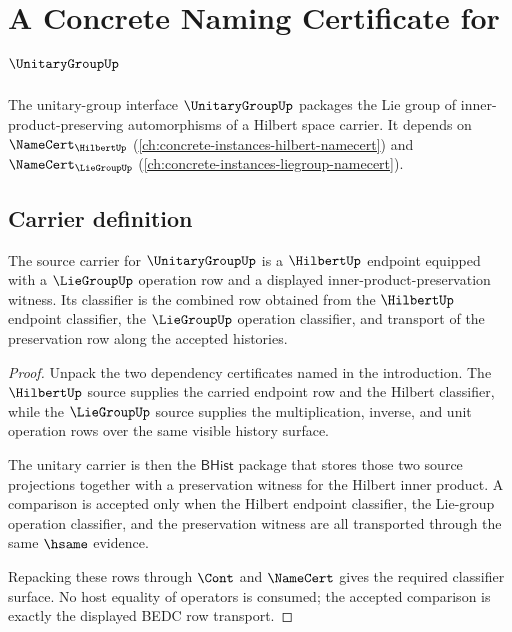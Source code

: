 \chapter{A Concrete Naming Certificate for $\UnitaryGroupUp$}
\label{ch:concrete-instances-unitarygroup-namecert}

The unitary-group interface $\UnitaryGroupUp$ packages the Lie group of inner-product-preserving automorphisms of a Hilbert space carrier. It depends on $\NameCert_{\HilbertUp}$ (\autoref{ch:concrete-instances-hilbert-namecert}) and $\NameCert_{\LieGroupUp}$ (\autoref{ch:concrete-instances-liegroup-namecert}).

\section{Carrier definition}
\label{sec:unitarygroup-carrier}

\begin{theorem}
\label{thm:unitarygroup-source-classifier-obligation}
The source carrier for $\UnitaryGroupUp$ is a $\HilbertUp$ endpoint equipped with a $\LieGroupUp$ operation row and a displayed inner-product-preservation witness. Its classifier is the combined row obtained from the $\HilbertUp$ endpoint classifier, the $\LieGroupUp$ operation classifier, and transport of the preservation row along the accepted histories.
\end{theorem}

\begin{proof}
Unpack the two dependency certificates named in the introduction. The $\HilbertUp$ source supplies the carried endpoint row and the Hilbert classifier, while the $\LieGroupUp$ source supplies the multiplication, inverse, and unit operation rows over the same visible history surface.

The unitary carrier is then the $\mathsf{BHist}$ package that stores those two source projections together with a preservation witness for the Hilbert inner product. A comparison is accepted only when the Hilbert endpoint classifier, the Lie-group operation classifier, and the preservation witness are all transported through the same $\hsame$ evidence.

Repacking these rows through $\Cont$ and $\NameCert$ gives the required classifier surface. No host equality of operators is consumed; the accepted comparison is exactly the displayed BEDC row transport.
\end{proof}

